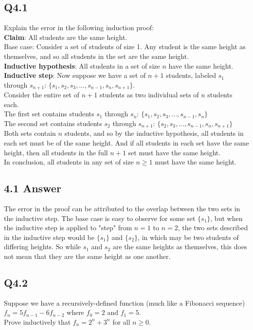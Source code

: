 \documentclass{article}
\begin{document}
\subsection*{Q4.1}
Explain the error in the following induction proof:
\\ \textbf{Claim}: All students are the same height.
\\ Base case: Consider a set of students of size 1. Any student is the same height as themselves, and so all students in the set are the same height.
\\ \textbf{Inductive hypothesis}: All students in a set of size $n$ have the same height. 
\\ \textbf{Inductive step}: Now suppose we have a set of $n+1$ students, labeled $s_1$ through $s_{n+1}$: $\{s_1,s_2,s_3,...,s_{n-1},s_n,s_{n+1}\}$.
\\ Consider the entire set of $n+1$ students as two individual sets of $n$ students each.
\\ The first set contains students $s_1$ through $s_n$: $\{s_1,s_2,s_3,...,s_{n-1},s_n\}$
\\ The second set contains students $s_2$ through $s_{n+1}$: $\{s_2,s_3,...,s_{n-1},s_n,s_{n+1}\}$
\\ Both sets contain $n$ students, and so by the inductive hypothesis, all students in each set must be of the same height. And if all students in each set have the same height, then all students in the full $n+1$ set must have the same height.
\\ In conclusion, all students in any set of size $n\geq1$ must have the same height.
\newpage
\subsection*{4.1 Answer}
The error in the proof can be attributed to the overlap between the two sets in the inductive step. The base case is easy to observe for some set $\{s_1\}$, but when the inductive step is applied to "step" from $n=1$ to $n=2$, the two sets described in the inductive step would be $\{s_1\}$ and $\{s_2\}$, in which may be two students of differing heights. So while $s_1$ and $s_2$ are the same heights as themselves, this does not mean that they are the same height as one another.
\newpage
\subsection*{Q4.2}
Suppose we have a recursively-defined function (much like a Fibonacci sequence) $f_n=5f_{n-1}-6f_{n-2}$ where $f_0=2$ and $f_1=5$.
\\ Prove inductively that $f_n=2^n+3^n$ for all $n\geq0$.
\newpage
\end{document}

